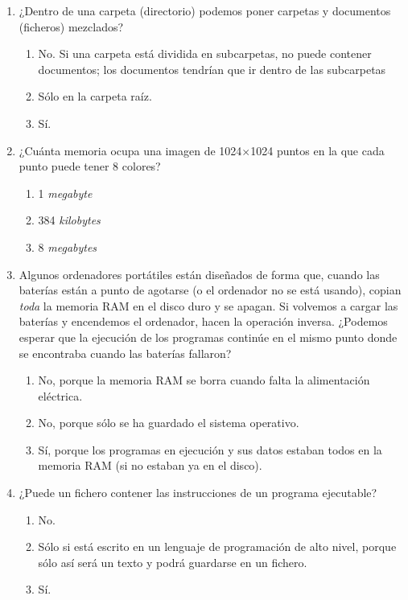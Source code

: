 \begin{enumerate}
\item ¿Dentro de una carpeta (directorio) podemos poner carpetas y documentos (ficheros) mezclados? \begin{enumerate} \item No. Si una carpeta está dividida en subcarpetas, no puede contener documentos; los documentos tendrían que ir dentro de las subcarpetas \item Sólo en la carpeta raíz. \item Sí. \end{enumerate} 

\item ¿Cuánta memoria ocupa una imagen de 1024$\times$1024 puntos en la que cada punto puede tener 8 colores? \begin{enumerate} \item 1 \emph{megabyte} \item 384 \emph{kilobytes} \item 8 \emph{megabytes} \end{enumerate} 

\item Algunos ordenadores portátiles están diseñados de forma que, cuando las baterías están a punto de agotarse (o el ordenador no se está usando), copian \emph{toda} la memoria RAM en el disco duro y se apagan. Si volvemos a cargar las baterías y encendemos el ordenador, hacen la operación inversa. ¿Podemos esperar que la ejecución de los programas continúe en el mismo punto donde se encontraba cuando las baterías fallaron? \begin{enumerate} \item No, porque la memoria RAM se borra cuando falta la alimentación eléctrica. \item No, porque sólo se ha guardado el sistema operativo. \item Sí, porque los programas en ejecución y sus datos estaban todos en la memoria RAM (si no estaban ya en el disco). \end{enumerate} 

\item ¿Puede un fichero contener las instrucciones de un programa ejecutable? \begin{enumerate} \item No. \item Sólo si está escrito en un lenguaje de programación de alto nivel, porque sólo así será un texto y podrá guardarse en un fichero. \item Sí. \end{enumerate} 


\end{enumerate}
